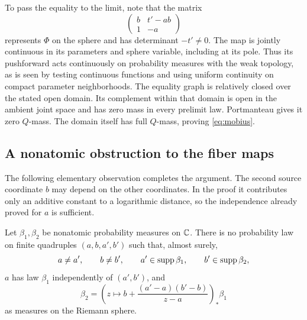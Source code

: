 To pass the equality to the limit, note that the matrix
\[
 \begin{pmatrix}b&t'-ab\\1&-a\end{pmatrix}
\]
represents $\Phi$ on the sphere and has determinant $-t'\ne0$.
The map is jointly continuous in its parameters and sphere variable,
including at its pole.  Thus its pushforward acts continuously on
probability measures with the weak topology, as is seen by testing
continuous functions and using uniform continuity on compact parameter
neighborhoods.  The equality graph is relatively closed over the
stated open domain.  Its complement within that domain is open in the
ambient joint space and has zero mass in every prelimit law.
Portmanteau gives it zero $Q$-mass.  The domain itself has full
$Q$-mass, proving \eqref{eq:mobius}.

\subsection{A nonatomic obstruction to the fiber maps}

The following elementary observation completes the argument. The
second source coordinate $b$ may depend on the other coordinates.
In the proof it contributes only an additive constant to a logarithmic
distance, so the independence already proved for $a$ is sufficient.

\begin{lemma}\label{lem:bounded-mobius}
Let $\beta_1,\beta_2$ be nonatomic probability measures on $\mathbb C$.
There is no probability law on finite quadruples $(a,b,a',b')$ such
that, almost surely,
\[
 a\ne a',\qquad b\ne b',\qquad
 a'\in\operatorname{supp}\beta_1,\qquad b'\in\operatorname{supp}\beta_2,
\]
$a$ has law $\beta_1$ independently of $(a',b')$, and
\[
 \beta_2=\left(z\mapsto
 b+\frac{(a'-a)(b'-b)}{z-a}\right)_*\beta_1
\]
as measures on the Riemann sphere.
\end{lemma}

